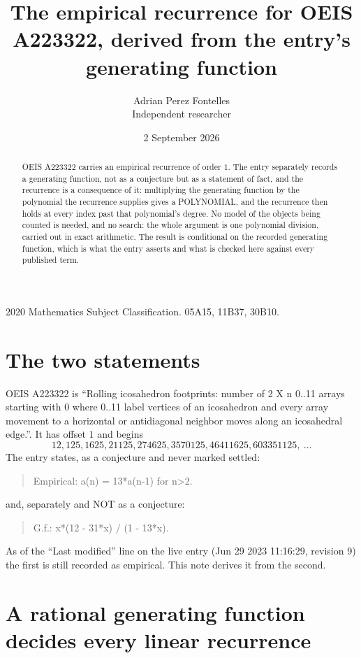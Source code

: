 \documentclass[11pt,a4paper]{article}
\title{The empirical recurrence for OEIS A223322, derived from the entry's generating function}
\author{Adrian Perez Fontelles\\ \small Independent researcher}
\date{2 September 2026}
\theoremstyle{plain}
\theoremstyle{definition}
\begin{document}
\maketitle

\begin{abstract}
OEIS A223322 carries an empirical recurrence of order $1$. The entry separately records a
generating function, not as a conjecture but as a statement of fact, and the recurrence is a
consequence of it: multiplying the generating function by the polynomial the recurrence
supplies gives a POLYNOMIAL, and the recurrence then holds at every index past that
polynomial's degree. No model of the objects being counted is needed, and no search: the
whole argument is one polynomial division, carried out in exact arithmetic. The result is
conditional on the recorded generating function, which is what the entry asserts and what is
checked here against every published term.
\end{abstract}

\noindent\small 2020 Mathematics Subject Classification. 05A15, 11B37, 30B10.\normalsize

\section{The two statements}

OEIS A223322 is ``Rolling icosahedron footprints: number of 2 X n 0..11 arrays starting with 0 where 0..11 label vertices of an icosahedron and every array movement to a horizontal or antidiagonal neighbor moves along an icosahedral edge.''. It has offset $1$ and begins
\[
12, 125, 1625, 21125, 274625, 3570125, 46411625, 603351125,\ \dots
\]
The entry states, as a conjecture and never marked settled:
\begin{quote}
Empirical: a(n) = 13*a(n-1) for n>2.
\end{quote}
and, separately and NOT as a conjecture:
\begin{quote}
G.f.: x*(12 - 31*x) / (1 - 13*x).
\end{quote}
As of the ``Last modified'' line on the live entry (Jun 29 2023 11:16:29, revision 9) the first is still
recorded as empirical. This note derives it from the second.

\section{A rational generating function decides every linear recurrence}
\end{document}

